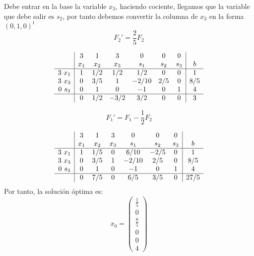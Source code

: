 \documentclass[11pt,fleqn]{book} %
\begin{document}
Debe entrar en la base la variable $x_3$, haciendo cociente, llegamos que la variable que debe salir es $s_2$, por tanto debemos convertir la columna de $x_3$ en la forma $(0, 1, 0)^t$
$$F_2'=\frac{2}{5}F_2$$

$$
\begin{array}{c|cccccc|c}
  & 3 & 1 & 3 & 0 & 0 & 0 &  \\
  & x_1 & x_2 & x_3 & s_1 & s_2 & s_3 & b \\ \hline
  3 ~ x_1 & 1 & 1/2 & 1/2 & 1/2 & 0 & 0 & 1 \\
  3 ~ x_3 & 0 & 3/5 & 1 & -2/10 & 2/5 & 0 & 8/5 \\
  0 ~ s_3 & 0 & 1 & 0 & -1 & 0 & 1 & 4 \\ \hline
  & 0 & 1/2 & -3/2 & 3/2 & 0 & 0 & 3
\end{array}
$$

$$
F_1'=F_1-\frac{1}{2}F_2$$$  $

$$
\begin{array}{c|cccccc|c}
  & 3 & 1 & 3 & 0 & 0 & 0 &  \\
  & x_1 & x_2 & x_3 & s_1 & s_2 & s_3 & b \\ \hline
  3 ~ x_1 & 1 & 1/5 & 0 & 6/10 & -2/5 & 0 & 1 \\
  3 ~ x_3 & 0 & 3/5 & 1 & -2/10 & 2/5 & 0 & 8/5 \\
  0 ~ s_3 & 0 & 1 & 0 & -1 & 0 & 1 & 4 \\ \hline
  & 0 &  7/5 & 0 & 6/5 & 3/5 & 0 & 27/5
\end{array}
$$
Por tanto, la solución óptima es:
$$ x_0=\left(
\begin{array}{c}
  \displaystyle \frac{1}{5} \\
  0 \\
  \displaystyle \frac{8}{5} \\
  0 \\
  0 \\
  4
\end{array}
\right)
$$
\end{document}
